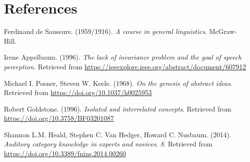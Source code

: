 \documentclass[
  man]{apa6}
\newlength{\cslhangindent}
\newlength{\cslentryspacingunit} %
\newenvironment{CSLReferences}[2] %
 {%
  \setlength{\parindent}{0pt}
  \ifodd #1
  \let\oldpar\par
  \def\par{\hangindent=\cslhangindent\oldpar}
  \fi
  \setlength{\parskip}{#2\cslentryspacingunit}
 }%
 {}
\begin{document}
\hypertarget{references}{%
\section{References}\label{references}}

\hypertarget{refs}{}
\begin{CSLReferences}{1}{0}
\leavevmode{}%
Ferdinand de Saussure. (1959/1916). \emph{A course in general linguistics}. McGraw-Hill.

\leavevmode{}%
Irene Appelbaum. (1996). \emph{The lack of invariance problem and the goal of speech perception}. Retrieved from \url{https://ieeexplore.ieee.org/abstract/document/607912}

\leavevmode{}%
Michael I. Posner, Steven W. Keele. (1968). \emph{On the genesis of abstract ideas}. Retrieved from \url{https://doi.org/10.1037/h0025953}

\leavevmode{}%
Robert Goldstone. (1996). \emph{Isolated and interrelated concepts}. Retrieved from \url{https://doi.org/10.3758/BF03201087}

\leavevmode{}%
Shannon L.M. Heald, Stephen C. Van Hedger, Howard C. Nusbaum. (2014). \emph{Auditory category knowledge in experts and novices}. \emph{8}. Retrieved from \url{https://doi.org/10.3389/fnins.2014.00260}

\end{CSLReferences}
\end{document}

